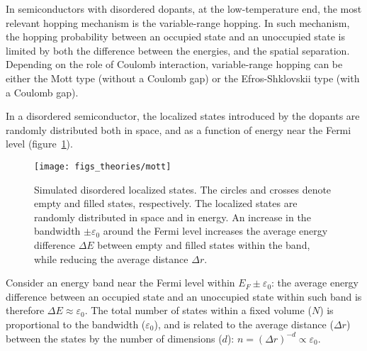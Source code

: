 In semiconductors with disordered dopants, at the low-temperature end, the most relevant hopping mechanism is the variable-range hopping. In such mechanism, the hopping probability between an occupied state and an unoccupied state is limited by both the difference between the energies, and the spatial separation. Depending on the role of Coulomb interaction, variable-range hopping can be either the Mott type (without a Coulomb gap) or the Efros-Shklovskii type (with a Coulomb gap).

In a disordered semiconductor, the localized states introduced by the dopants are randomly distributed both in space, and as a function of energy near the Fermi level (figure~\ref{fig:mott}). %
\begin{figure}[ht]%
    \centering%
    \texttt{[image: figs\_theories/mott]}%
    \caption[Simulated disordered localized states]{\label{fig:mott}Simulated disordered localized states. The circles and crosses denote empty and filled states, respectively. The localized states are randomly distributed in space and in energy. An increase in the bandwidth $\pm\varepsilon_0$ around the Fermi level increases the average energy difference $\Delta E$ between empty and filled states within the band, while reducing the average distance $\Delta r$.}%
\end{figure}%
%
Consider an energy band near the Fermi level within $E_F \pm \varepsilon_0$: the average energy difference between an occupied state and an unoccupied state within such band is therefore $\Delta E \approx \varepsilon_0$. The total number of states within a fixed volume ($N$) is proportional to the bandwidth ($\varepsilon_0$), and is related to the average distance ($\Delta r$) between the states by the number of dimensions ($d$): $n = (\Delta r)^{-d} \propto \varepsilon_0$.